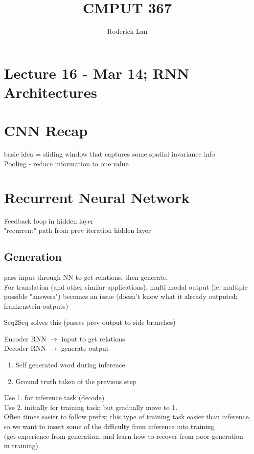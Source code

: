 \documentclass{article}
\title{CMPUT 367}
\author{Roderick Lan}
\date{}
\begin{document}
\maketitle

\tableofcontents
\break

\section*{Lecture 16 - Mar 14; RNN Architectures}

\section{CNN Recap}
basic idea = sliding window that captures some spatial invariance info 
\\
Pooling - reduce information to one value





\section{Recurrent Neural Network}
Feedback loop in hidden layer
\\
"recurrent" path from prev iteration hidden layer


\subsection{Generation}
pass input through NN to get relations, then generate. 
\\
For translation (and other similar applications), multi modal output (ie. multiple
possible "answers") becomes an issue (doesn't know what it already outputed; 
frankenstein outputs)
\begin{list}{}{}
    \item Seq2Seq solves this (passes prev output to side branches)
\end{list}
\noindent
Encoder RNN $\to$ input to get relations
\\
Decoder RNN $\to$ generate output
\begin{enumerate}
    \item Self generated word during inference
    \item Ground truth taken of the previous step
\end{enumerate}
Use 1. for inference task (decode)
\\
Use 2. initially for training task; but gradually move to 1.
\\
Often times easier to follow prefix; 
this type of training task easier than inference, so we want to insert some of the
difficulty from inference into training\\
(get experience from generation, and learn how to recover from poor generation in training)
\end{document}
